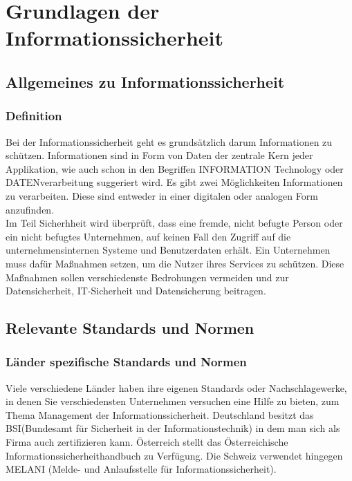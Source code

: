 \chapter{Grundlagen der Informationssicherheit}
\strahlhofer

\section{Allgemeines zu Informationssicherheit}
\subsection{Definition}
Bei der Informationssicherheit geht es grundsätzlich darum Informationen zu schützen. Informationen sind in Form von Daten der zentrale Kern jeder Applikation, wie auch schon in den Begriffen INFORMATION Technology oder DATENverarbeitung suggeriert wird. Es gibt zwei Möglichkeiten Informationen zu verarbeiten. Diese sind entweder in einer digitalen oder analogen Form anzufinden.
\\
Im Teil Sicherhheit wird überprüft, dass eine fremde, nicht befugte Person oder ein nicht befugtes Unternehmen, auf keinen Fall den Zugriff auf die unternehmensinternen Systeme und Benutzerdaten erhält. Ein Unternehmen muss dafür Maßnahmen setzen, um die Nutzer ihres Services zu schützen. Diese Maßnahmen sollen verschiedenste Bedrohungen vermeiden und zur Datensicherheit, IT-Sicherheit und Datensicherung beitragen.
\\

\section{Relevante Standards und Normen}

\subsection{Länder spezifische Standards und Normen}
Viele verschiedene Länder haben ihre eigenen Standards oder Nachschlagewerke, in denen Sie verschiedensten Unternehmen versuchen eine Hilfe zu bieten, zum Thema Management der Informationssicherheit.
Deutschland besitzt das BSI(Bundesamt für Sicherheit in der Informationstechnik) in dem man sich als Firma auch zertifizieren kann. Österreich stellt das Österreichische Informationssicherheithandbuch zu Verfügung. Die Schweiz verwendet hingegen MELANI (Melde- und Anlaufsstelle für Informationssicherheit).


